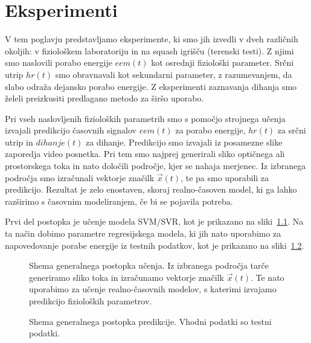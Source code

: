 \chapter{Eksperimenti}\label{sec:eksperimenti}
V tem poglavju predstavljamo eksperimente, ki smo jih izvedli v dveh različnih okoljih: v fiziološkem laboratoriju in na squash igrišču (terenski testi). Z njimi smo naslovili porabo energije $eem(t)$ kot osrednji fiziološki parameter. Srčni utrip $hr(t)$ smo obravnavali kot sekundarni parameter, z razumevanjem, da slabo odraža dejansko porabo energije. Z eksperimenti zaznavanja dihanja smo želeli preizkusiti predlagano metodo za širšo uporabo.

Pri vseh naslovljenih fizioloških parametrih smo s pomočjo strojnega učenja izvajali predikcijo časovnih signalov $eem(t)$ za porabo energije, $hr(t)$ za srčni utrip in $dihanje(t)$ za dihanje. Predikcijo smo izvajali iz posamezne slike zaporedja video posnetka. Pri tem smo najprej generirali sliko optičnega ali prostorskega toka in nato določili področje, kjer se nahaja merjenec. Iz izbranega področja smo izračunali vektorje značilk $\vec{x}(t)$, te pa smo uporabili za predikcijo. Rezultat je zelo enostaven, skoraj realno-časoven model, ki ga lahko razširimo s časovnim modeliranjem, če bi se pojavila potreba. 

Prvi del postopka je učenje modela SVM/SVR, kot je prikazano na sliki~\ref{fig:shema-generalnega-postopka01}. Na ta način dobimo parametre regresijskega modela, ki jih nato uporabimo za napovedovanje porabe energije iz testnih podatkov, kot je prikazano na sliki~\ref{fig:shema-generalnega-postopka02}.

\begin{figure}[!htb]
	\centering
	\resizebox{\columnwidth}{!}{}
	\caption[Shema generalnega postopka učenja]{Shema generalnega postopka učenja. Iz izbranega področja tarče generiramo sliko toka in izračunamo vektorje značilk $\vec{x}(t)$. Te nato uporabimo za učenje realno-časovnih modelov, s katerimi izvajamo predikcijo fizioloških parametrov.}
	\label{fig:shema-generalnega-postopka01}
\end{figure}

\begin{figure}[!htb]
	\centering
	\resizebox{\columnwidth}{!}{}
	\caption[Shema generalnega postopka predikcije]{Shema generalnega postopka predikcije. Vhodni podatki so testni podatki.}
	\label{fig:shema-generalnega-postopka02}
\end{figure}

